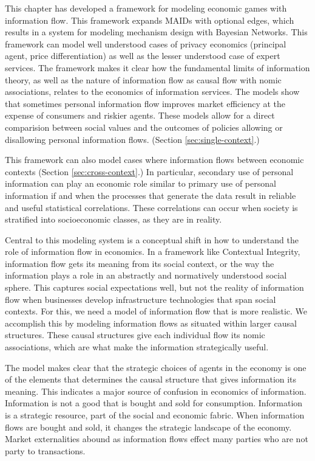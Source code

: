 \documentclass[../thesis.tex]{subfiles}
\begin{document}
This chapter has developed a framework for modeling
economic games with information flow.
This framework expands MAIDs with optional edges,
which results in a system for modeling mechanism
design with Bayesian Networks.
This framework can model well understood cases of
privacy economics (principal agent, price differentiation)
as well as the lesser understood case of expert services.
The framework makes it clear how the fundamental limits
of information theory, as well as the nature of information
flow as causal flow with nomic associations,
relates to the economics of information
services.
The models show that sometimes personal information flow
improves market efficiency at the expense of consumers
and riskier agents.
These models allow for a direct comparision between social
values and the outcomes of policies allowing or disallowing
personal information flows. (Section \ref{sec:single-context}.)

This framework can also model cases where information
flows between economic contexts
(Section \ref{sec:cross-context}.)
In particular, secondary use of personal information can
play an economic role similar to primary use of personal
information if and when the processes that generate
the data result in reliable and useful statistical correlations.
These correlations can occur when society is stratified into
socioeconomic classes, as they are in reality.

Central to this modeling system is a conceptual shift in
how to understand the role of information flow in economics.
In a framework like Contextual Integrity, information flow
gets its meaning from its social context, or the way
the information plays a role in an abstractly and normatively
understood social sphere.
This captures social expectations well, but not the reality
of information flow when businesses develop infrastructure
technologies that span social contexts.
For this, we need a model of information flow that is more
realistic.
We accomplish this by modeling information flows as situated
within larger causal structures.
These causal structures give each individual flow its
nomic associations, which are what make the information
strategically useful.

The model makes clear that the strategic choices of agents
in the economy is one of
the elements that determines the causal structure that gives
information its meaning.
This indicates a major source of confusion in economics of information.
Information is not a good that is bought and sold for consumption.
Information is a strategic resource, part of the social and economic fabric.
When information flows are bought and sold, it changes the
strategic landscape of the economy.
Market externalities abound as information flows effect many parties
who are not party to transactions.
\end{document}
